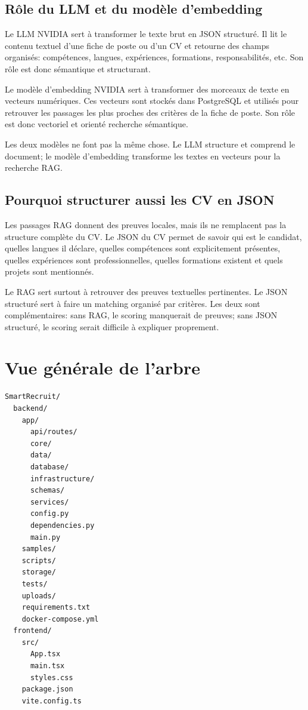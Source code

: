 \documentclass[12pt,a4paper]{article}
\begin{document}
\subsection{Rôle du LLM et du modèle d'embedding}

Le LLM NVIDIA sert à transformer le texte brut en JSON structuré. Il lit le contenu textuel d'une fiche de poste ou d'un CV et retourne des champs organisés: compétences, langues, expériences, formations, responsabilités, etc. Son rôle est donc sémantique et structurant.

Le modèle d'embedding NVIDIA sert à transformer des morceaux de texte en vecteurs numériques. Ces vecteurs sont stockés dans PostgreSQL et utilisés pour retrouver les passages les plus proches des critères de la fiche de poste. Son rôle est donc vectoriel et orienté recherche sémantique.

Les deux modèles ne font pas la même chose. Le LLM structure et comprend le document; le modèle d'embedding transforme les textes en vecteurs pour la recherche RAG.

\subsection{Pourquoi structurer aussi les CV en JSON}

Les passages RAG donnent des preuves locales, mais ils ne remplacent pas la structure complète du CV. Le JSON du CV permet de savoir qui est le candidat, quelles langues il déclare, quelles compétences sont explicitement présentes, quelles expériences sont professionnelles, quelles formations existent et quels projets sont mentionnés.

Le RAG sert surtout à retrouver des preuves textuelles pertinentes. Le JSON structuré sert à faire un matching organisé par critères. Les deux sont complémentaires: sans RAG, le scoring manquerait de preuves; sans JSON structuré, le scoring serait difficile à expliquer proprement.

\section{Vue générale de l'arbre}

\begin{verbatim}
SmartRecruit/
  backend/
    app/
      api/routes/
      core/
      data/
      database/
      infrastructure/
      schemas/
      services/
      config.py
      dependencies.py
      main.py
    samples/
    scripts/
    storage/
    tests/
    uploads/
    requirements.txt
    docker-compose.yml
  frontend/
    src/
      App.tsx
      main.tsx
      styles.css
    package.json
    vite.config.ts
\end{verbatim}
\end{document}
